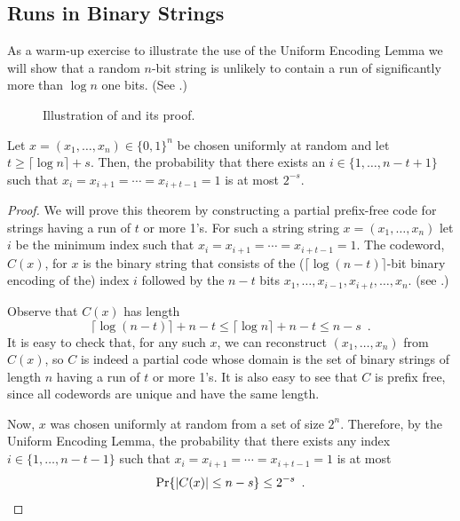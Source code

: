 \documentclass{patmorin}
\begin{document}
\subsection{Runs in Binary Strings}

As a warm-up exercise to illustrate the use of the Uniform Encoding
Lemma we will show that a random $n$-bit string is unlikely to contain
a run of significantly more than $\log n$ one bits.  (See .)

\begin{figure}
  \caption{Illustration of  and its proof.}
\end{figure}

\begin{thm}
  Let $x=(x_1,\ldots,x_n)\in\{0,1\}^n$ be chosen uniformly at random
  and let $t \ge \lceil\log n\rceil + s$. Then, the probability that
  there exists an $i\in\{1,\ldots,n-t+1\}$ such that
  $x_i=x_{i+1}=\cdots=x_{i+t-1}=1$ is at most $2^{-s}$.
\end{thm}

\begin{proof}
  We will prove this theorem by constructing a partial prefix-free
  code for strings having a run of $t$ or more 1's.  For such a string
  string $x=(x_1,\ldots,x_n)$ let $i$ be the minimum index such that
  $x_i=x_{i+1}=\cdots=x_{i+t-1}=1$. The codeword, $C(x)$, for $x$ is
  the binary string that consists of the
  ($\lceil\log (n - t)\rceil$-bit binary encoding of the) index $i$
  followed by the $n-t$ bits
  $x_1,\ldots,x_{i-1},x_{i+t},\ldots,x_n$. (see .)

  Observe that $C(x)$ has length 
  \[
  \lceil\log (n - t)\rceil + n - t \le \lceil\log n\rceil + n - t \le
  n-s \enspace .
  \]
  It is easy to check that, for any such $x$, we can reconstruct
  $(x_1,\ldots,x_n)$ from $C(x)$, so $C$ is indeed a partial code
  whose domain is the set of binary strings of length $n$ having a run
  of $t$ or more 1's.  It is also easy to see that $C$ is prefix free,
  since all codewords are unique and have the same length.

  Now, $x$ was chosen uniformly at random from a set of size $2^{n}$.
  Therefore, by the Uniform Encoding Lemma, the probability that there
  exists any index $i\in\{1,\ldots,n-t-1\}$ such that
  $x_i=x_{i+1}=\cdots=x_{i+t-1}=1$ is at most
  \[
      \Pr\{|C(x)|\le n-s\} \le 2^{-s} \enspace . \qedhere 
  \]
\end{proof}
\end{document}
